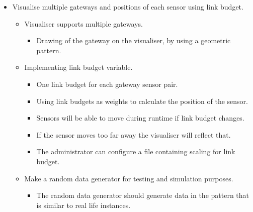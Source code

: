\documentclass[../document]{subfiles}
\begin{document}
\begin{itemize}
	\item
	Visualise multiple gateways and positions of each sensor using link budget.
	\begin{itemize}
		\item
		Visualiser supports multiple gateways.
		\begin{itemize}
			\item
			Drawing of the gateway on the visualiser, by using a geometric pattern.
		\end{itemize}
		\item
		Implementing link budget variable.
		\begin{itemize}
			\item
			One link budget for each gateway sensor pair.
			\item
			Using link budgets as weights to calculate the position of the sensor.
			\item
			Sensors will be able to move during runtime if link budget changes.
			\item
			If the sensor moves too far away the visualiser will reflect that.
			\item
			The administrator can configure a file containing scaling for link budget.
		\end{itemize}
		\item
		Make a random data generator for testing and simulation purposes.
		\begin{itemize}
			\item
			The random data generator should generate data in the pattern that is similar to real life instances.
		\end{itemize}
	\end{itemize}
\end{itemize}
	
\end{document}
